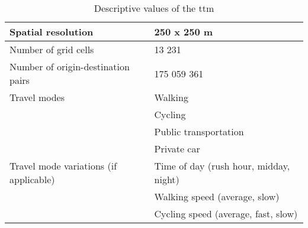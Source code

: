 \begin{table}[H]
	\caption{Descriptive values of the \acrshort{ttm}}
	\label{tab:ttm description}
	\centering
	\begin{tabular}{ | L{0.45\textwidth} | L{0.45\textwidth} | }
		\hline
		Spatial resolution
		& 250 x 250 m
		\\
		\hline
		Number of grid cells
		& 13 231
		\\
		\hline
		Number of origin-destination pairs
		& 175 059 361
		\\
		\hline
		Travel modes
		& \tabitem Walking \\
		& \tabitem Cycling \\
		& \tabitem Public transportation \\
		& \tabitem Private car \\
		\hline
		Travel mode variations (if applicable)
		& \tabitem Time of day (rush hour, midday, night) \\
		& \tabitem Walking speed (average, slow) \\
		& \tabitem Cycling speed (average, fast, slow) \\
		\hline
	\end{tabular}
\end{table}
